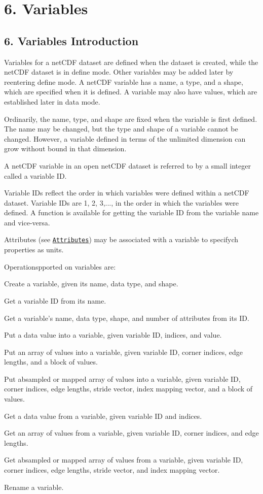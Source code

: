 \section*{6. Variables }

\subsection*{6. Variables Introduction }

Variables for a net\+C\+DF dataset are defined when the dataset is created, while the net\+C\+DF dataset is in define mode. Other variables may be added later by reentering define mode. A net\+C\+DF variable has a name, a type, and a shape, which are specified when it is defined. A variable may also have values, which are established later in data mode.

Ordinarily, the name, type, and shape are fixed when the variable is first defined. The name may be changed, but the type and shape of a variable cannot be changed. However, a variable defined in terms of the unlimited dimension can grow without bound in that dimension.

A net\+C\+DF variable in an open net\+C\+DF dataset is referred to by a small integer called a variable ID.

Variable I\+Ds reflect the order in which variables were defined within a net\+C\+DF dataset. Variable I\+Ds are 1, 2, 3,..., in the order in which the variables were defined. A function is available for getting the variable ID from the variable name and vice-\/versa.

Attributes (see \href{#Attributes}{\tt Attributes}) may be associated with a variable to specifych properties as units.

Operationspported on variables are\+:


\begin{DoxyItemize}
\item Create a variable, given its name, data type, and shape.
\item Get a variable ID from its name.
\item Get a variable’s name, data type, shape, and number of attributes from its ID.
\item Put a data value into a variable, given variable ID, indices, and value.
\item Put an array of values into a variable, given variable ID, corner indices, edge lengths, and a block of values.
\item Put absampled or mapped array of values into a variable, given variable ID, corner indices, edge lengths, stride vector, index mapping vector, and a block of values.
\item Get a data value from a variable, given variable ID and indices.
\item Get an array of values from a variable, given variable ID, corner indices, and edge lengths.
\item Get absampled or mapped array of values from a variable, given variable ID, corner indices, edge lengths, stride vector, and index mapping vector.
\item Rename a variable.
\end{DoxyItemize}

